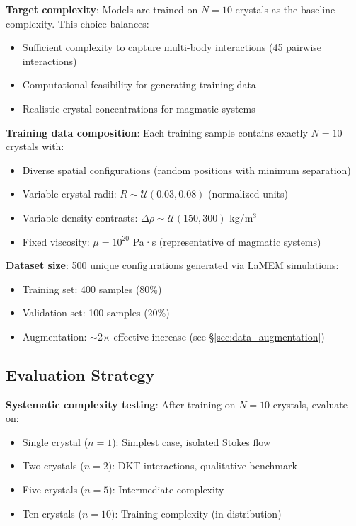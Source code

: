 \textbf{Target complexity}: Models are trained on $N=10$ crystals as the baseline complexity. This choice balances:
\begin{itemize}
    \item Sufficient complexity to capture multi-body interactions (45 pairwise interactions)
    \item Computational feasibility for generating training data
    \item Realistic crystal concentrations for magmatic systems
\end{itemize}

\textbf{Training data composition}: Each training sample contains exactly $N=10$ crystals with:
\begin{itemize}
    \item Diverse spatial configurations (random positions with minimum separation)
    \item Variable crystal radii: $R \sim \mathcal{U}(0.03, 0.08)$ (normalized units)
    \item Variable density contrasts: $\Delta\rho \sim \mathcal{U}(150, 300)$ kg/m$^3$
    \item Fixed viscosity: $\mu = 10^{20}$ Pa·s (representative of magmatic systems)
\end{itemize}

\textbf{Dataset size}: 500 unique configurations generated via LaMEM simulations:
\begin{itemize}
    \item Training set: 400 samples (80\%)
    \item Validation set: 100 samples (20\%)
    \item Augmentation: $\sim$2$\times$ effective increase (see \S\ref{sec:data_augmentation})
\end{itemize}

\subsection{Evaluation Strategy}

\textbf{Systematic complexity testing}: After training on $N=10$ crystals, evaluate on:
\begin{itemize}
    \item Single crystal ($n=1$): Simplest case, isolated Stokes flow
    \item Two crystals ($n=2$): DKT interactions, qualitative benchmark
    \item Five crystals ($n=5$): Intermediate complexity
    \item Ten crystals ($n=10$): Training complexity (in-distribution)
\end{itemize}

